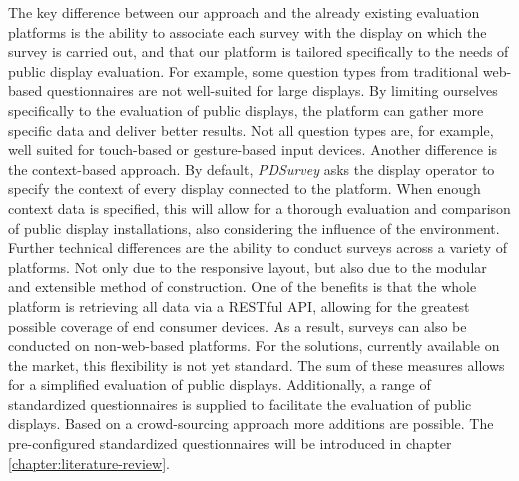 	The key difference between our approach and the already existing evaluation platforms is the ability to associate each survey with the display on which the survey is carried out, and that our platform is tailored specifically to the needs of public display evaluation. For example, some question types from traditional web-based questionnaires are not well-suited for large displays. By limiting ourselves specifically to the evaluation of public displays, the platform can gather more specific data and deliver better results. Not all question types are, for example, well suited for touch-based or gesture-based input devices. 
	Another difference is the context-based approach. By default, \textit{PDSurvey} asks the display operator to specify the context of every display connected to the platform. When enough context data is specified, this will allow for a thorough evaluation and comparison of public display installations, also considering the influence of the environment.
	Further technical differences are the ability to conduct surveys across a variety of platforms. Not only due to the responsive layout, but also due to the modular and extensible method of construction. One of the benefits is that the whole platform is retrieving all data via a RESTful API, allowing for the greatest possible coverage of end consumer devices. As a result, surveys can also be conducted on non-web-based platforms. For the solutions, currently available on the market, this flexibility is not yet standard.
	The sum of these measures allows for a simplified evaluation of public displays. Additionally, a range of standardized questionnaires is supplied to facilitate the evaluation of public displays. Based on a crowd-sourcing approach more additions are possible. The pre-configured standardized questionnaires will be introduced in chapter \ref{chapter:literature-review}.




